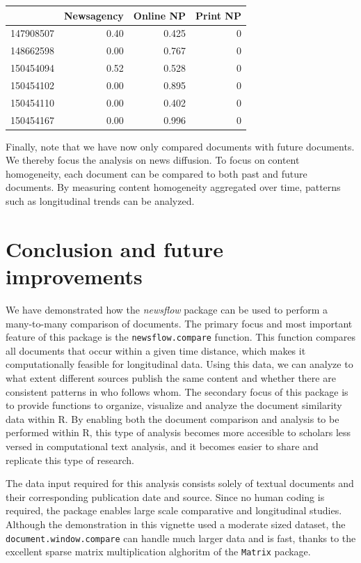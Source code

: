 \documentclass[]{article}
\begin{document}
\begin{longtable}[c]{@{}lrrr@{}}
\toprule
& Newsagency & Online NP & Print NP\tabularnewline
\midrule
\endhead
147908507 & 0.40 & 0.425 & 0\tabularnewline
148662598 & 0.00 & 0.767 & 0\tabularnewline
150454094 & 0.52 & 0.528 & 0\tabularnewline
150454102 & 0.00 & 0.895 & 0\tabularnewline
150454110 & 0.00 & 0.402 & 0\tabularnewline
150454167 & 0.00 & 0.996 & 0\tabularnewline
\bottomrule
\end{longtable}

Finally, note that we have now only compared documents with future
documents. We thereby focus the analysis on news diffusion. To focus on
content homogeneity, each document can be compared to both past and
future documents. By measuring content homogeneity aggregated over time,
patterns such as longitudinal trends can be analyzed.

\section{Conclusion and future
improvements}\label{conclusion-and-future-improvements}

We have demonstrated how the \emph{newsflow} package can be used to
perform a many-to-many comparison of documents. The primary focus and
most important feature of this package is the \texttt{newsflow.compare}
function. This function compares all documents that occur within a given
time distance, which makes it computationally feasible for longitudinal
data. Using this data, we can analyze to what extent different sources
publish the same content and whether there are consistent patterns in
who follows whom. The secondary focus of this package is to provide
functions to organize, visualize and analyze the document similarity
data within R. By enabling both the document comparison and analysis to
be performed within R, this type of analysis becomes more accesible to
scholars less versed in computational text analysis, and it becomes
easier to share and replicate this type of research.

The data input required for this analysis consists solely of textual
documents and their corresponding publication date and source. Since no
human coding is required, the package enables large scale comparative
and longitudinal studies. Although the demonstration in this vignette
used a moderate sized dataset, the \texttt{document.window.compare} can
handle much larger data and is fast, thanks to the excellent sparse
matrix multiplication alghoritm of the \texttt{Matrix} package.
\end{document}
